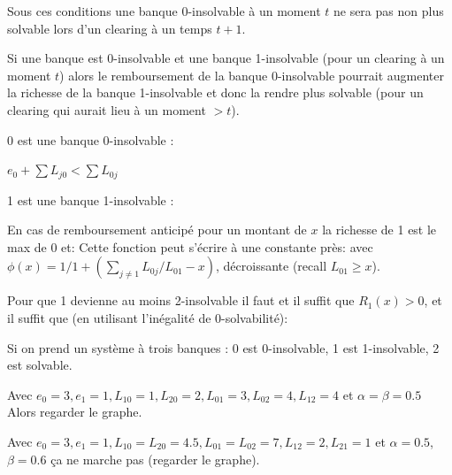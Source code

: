 \documentclass[11pt,oneside,twocolumn]{article}
\begin{document}
Sous ces conditions une banque 0-insolvable à un moment $t$ ne sera pas non plus solvable lors d'un clearing à un temps $t+1$.

Si une banque est 0-insolvable et une banque 1-insolvable (pour un clearing à un moment $t$) alors le remboursement de la banque 0-insolvable pourrait augmenter la richesse de la banque 1-insolvable et donc la rendre plus solvable (pour un clearing qui aurait lieu à un moment $>t$).

0 est une banque 0-insolvable :

$e_0 + \sum L_{j0} < \sum L_{0j}$

1 est une banque 1-insolvable :

En cas de remboursement anticipé pour un montant de $x$ la richesse de 1 est le max de 0 et:
Cette fonction peut s'écrire à une constante près:
avec $\phi(x) = 1/ 1 + (\sum_{j\neq 1}L_{0j}/L_{01}-x)$,
décroissante (recall $L_{01}\geq x$).

Pour que 1 devienne au moins 2-insolvable il faut et il suffit que $R_1(x)>0$, et il suffit que (en utilisant l'inégalité de 0-solvabilité):


Si on prend un système à trois banques :
0 est 0-insolvable, 1 est 1-insolvable, 2 est solvable.

Avec
$e_0 = 3, e_1 = 1, L_{10}= 1, L_{20}=2, L_{01}=3, L_{02}=4, L_{12} = 4$ et
$\alpha = \beta =0.5$
Alors regarder le graphe.

Avec $e_0 = 3, e_1 = 1, L_{10}=  L_{20}=4.5, L_{01}=L_{02}=7, L_{12} = 2, L_{21}=1$  et
$\alpha = 0.5$,
$\beta =0.6$ ça ne marche pas (regarder le graphe).
\end{document}
